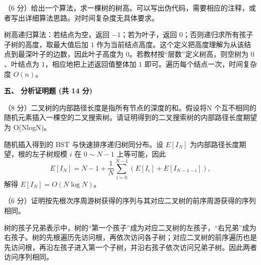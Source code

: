 \begin{question}
（6 分）给出一个算法，求一棵树的树高。可以写出伪代码，需要相应的注释，或者写出详细算法思路。对时间复杂度无具体要求。
\begin{solution}
树高递归算法：若结点为空，返回 $-1$；若为叶子，返回 $0$；否则递归求所有孩子子树的高度，取最大值后加 $1$ 作为当前结点高度。这个定义把高度理解为从该结点到最深叶子的边数，因此叶子高度为 $0$。若教材按“层数”定义树高，则空树为 $0$、叶结点为 $1$，相应地把上述返回值整体加 $1$ 即可。遍历每个结点一次，时间复杂度 $O(n)$。
\end{solution}
\end{question}

\textbf{五、 分析证明题 (共 14 分)}
\begin{question}
（8 分）二叉树的内部路径长度是指所有节点的深度的和。假设将N 个互不相同的随机元素插入一棵空的二叉搜索树。请证明得到的二叉搜索树的内部路径长度期望为 O(NlogN)。
\begin{solution}
随机插入得到的 BST 与快速排序递归树同分布。设 $E[I_N]$ 为内部路径长度期望，根的左子树规模 $i$ 在 $0\sim N-1$ 上等可能，因此
  \[
  E[I_N]=N-1+\frac1N\sum_{i=0}^{N-1}(E[I_i]+E[I_{N-1-i}]),
  \]
  解得 $E[I_N]=O(N\log N)$。
\end{solution}
\end{question}

\begin{question}
（6 分）证明按先根次序周游树获得的序列与其对应二叉树的前序周游获得的序列相同。
\begin{solution}
树的孩子兄弟表示中，树的“第一个孩子”成为对应二叉树的左孩子，“右兄弟”成为右孩子。树的先根遍历先访问根，再依次访问各子树；对应二叉树的前序遍历也是先访问根，再沿左孩子进入第一个子树，并沿右孩子依次访问兄弟子树。因此两者访问序列相同。
\end{solution}
\end{question}
